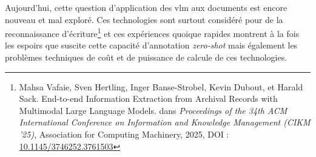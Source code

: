 Aujourd'hui, cette question d'application des \gls{vlm} aux documents est encore nouveau et mal exploré. Ces technologies sont surtout considéré pour de la reconnaissance d'écriture\footnote{Mahsa Vafaie, Sven Hertling, Inger Banse-Strobel, Kevin Dubout, et Harald Sack. \og End-to-end Information Extraction from Archival Records with Multimodal Large Language Models. \fg dans \textit{Proceedings of the 34th ACM International Conference on Information and Knowledge Management (CIKM '25)}, Association for Computing Machinery, 2025, DOI : \href{https://doi.org/10.1145/3746252.3761503}{10.1145/3746252.3761503}} et ces expériences quoique rapides montrent à la fois les espoirs que suscite cette capacité d'annotation \textit{zero-shot} mais également les problèmes techniques de coût et de puissance de calcule de ces technologies. 


